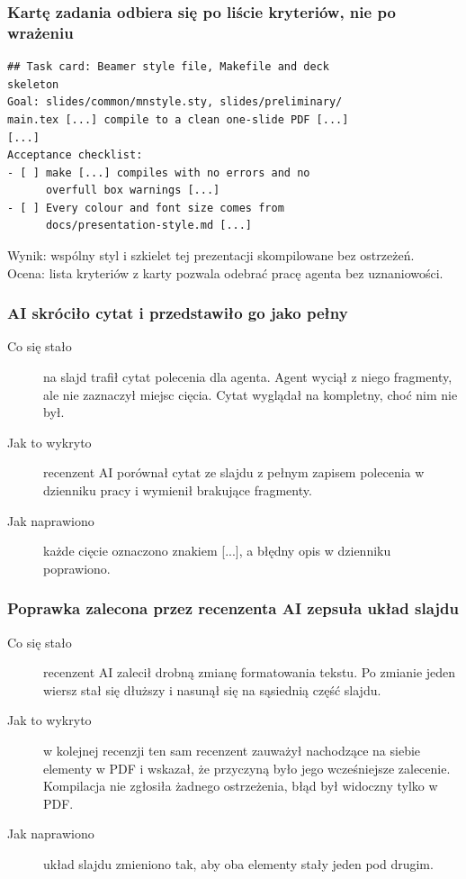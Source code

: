 
\begin{frame}[fragile]
  \frametitle{Kartę zadania odbiera się po liście kryteriów, nie po wrażeniu}
  {\footnotesize
\begin{verbatim}
## Task card: Beamer style file, Makefile and deck
skeleton
Goal: slides/common/mnstyle.sty, slides/preliminary/
main.tex [...] compile to a clean one-slide PDF [...]
[...]
Acceptance checklist:
- [ ] make [...] compiles with no errors and no
      overfull box warnings [...]
- [ ] Every colour and font size comes from
      docs/presentation-style.md [...]
\end{verbatim}}
  \vskip1mm
  Wynik: wspólny styl i szkielet tej prezentacji skompilowane bez ostrzeżeń.\\
  Ocena: lista kryteriów z karty pozwala odebrać pracę agenta bez
  uznaniowości.
\end{frame}

\begin{frame}
  \frametitle{AI skróciło cytat i przedstawiło go jako pełny}
  \begin{description}
    \item[Co się stało] na slajd trafił cytat polecenia dla agenta. Agent
      wyciął z niego fragmenty, ale nie zaznaczył miejsc cięcia. Cytat
      wyglądał na kompletny, choć nim nie był.
    \item[Jak to wykryto] recenzent AI porównał cytat ze slajdu z pełnym
      zapisem polecenia w dzienniku pracy i wymienił brakujące fragmenty.
    \item[Jak naprawiono] każde cięcie oznaczono znakiem [...], a błędny
      opis w dzienniku poprawiono.
  \end{description}
\end{frame}

\begin{frame}
  \frametitle{Poprawka zalecona przez recenzenta AI zepsuła układ slajdu}
  \begin{description}
    \item[Co się stało] recenzent AI zalecił drobną zmianę formatowania
      tekstu. Po zmianie jeden wiersz stał się dłuższy i nasunął się na
      sąsiednią część slajdu.
    \item[Jak to wykryto] w kolejnej recenzji ten sam recenzent zauważył
      nachodzące na siebie elementy w PDF i wskazał, że przyczyną było
      jego wcześniejsze zalecenie. Kompilacja nie zgłosiła żadnego
      ostrzeżenia, błąd był widoczny tylko w PDF.
    \item[Jak naprawiono] układ slajdu zmieniono tak, aby oba elementy
      stały jeden pod drugim.
  \end{description}
\end{frame}
